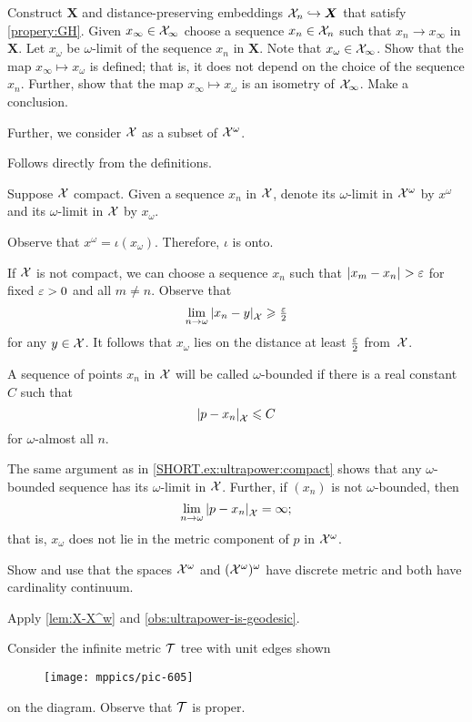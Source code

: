Construct $\bm{X}$ and distance-preserving embeddings $\mathcal{X}_n\hookrightarrow\bm{X}$ that satisfy \ref{propery:GH}.
Given $x_\infty\in \mathcal{X}_\infty$ choose a sequence $x_n\in \mathcal{X}_n$ such that $x_n\to x_\infty$ in $\bm{X}$.
Let $x_\omega$ be $\omega$-limit of the sequence $x_n$ in $\bm{X}$.
Note that $x_\omega\in \mathcal{X}_\infty$.
Show that the map $x_\infty\mapsto x_\omega$ is defined; that is, it does not depend on the choice of the sequence $x_n$.
Further, show that the map $x_\infty\mapsto x_\omega$ is an isometry of $\mathcal{X}_\infty$.
Make a conclusion.

Further, we consider $\mathcal{X}$ as a subset of $\mathcal{X}^\omega$.

 Follows directly from the definitions.

Suppose $\mathcal{X}$ compact.
Given a sequence $x_n$ in $\mathcal{X}$, denote its $\omega$-limit in $\mathcal{X}^\omega$ by $x^\omega$ and its $\omega$-limit in $\mathcal{X}$ by $x_\omega$.

Observe that $x^\omega=\iota(x_\omega)$.
Therefore, $\iota$ is onto.

If $\mathcal{X}$ is not compact, we can choose a sequence $x_n$ such that $\dist{x_m}{x_n}{}>\eps$ for fixed $\varepsilon>0$ and all $m\ne n$.
Observe that
\[\lim_{n\to\omega}\dist{x_n}{y}{\spc{X}}\ge \tfrac\eps2\]
for any $y\in\mathcal{X}$.
It follows that $x_\omega$ lies on the distance at least $\tfrac{\varepsilon}2$ from~$\mathcal{X}$.

A sequence of points $x_n$ in $\mathcal{X}$ will be called $\omega$-bounded if there is a real constant $C$ such that
\[\dist{p}{x_n}{\spc{X}}\le C\] 
for $\omega$-almost all $n$.

The same argument as in \ref{SHORT.ex:ultrapower:compact} shows that any $\omega$-bounded sequence has its $\omega$-limit in $\mathcal{X}$.
Further, if $(x_n)$ is not  $\omega$-bounded, then 
\[\lim_{n\to\omega}\dist{p}{x_n}{\spc{X}}=\infty;\]
that is, $x_\omega$ does not lie in the metric component of $p$ in $\mathcal{X}^\omega$.

 Show and use that the spaces $\mathcal{X}^\omega$ and $(\mathcal{X}^\omega)^\omega$ have discrete metric and both have cardinality continuum.

Apply \ref{lem:X-X^w} and \ref{obs:ultrapower-is-geodesic}.

 Consider the infinite metric $\mathcal{T}$ tree with unit edges shown
\begin{figure}[ht!]
\vskip-0mm
\centering
\texttt{[image: mppics/pic-605]}
\end{figure}
on the diagram. Observe that $\mathcal{T}$ is proper.


